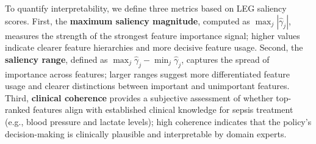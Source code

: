 To quantify interpretability, we define three metrics based on LEG saliency scores. First, the \textbf{maximum saliency magnitude}, computed as $\max_j |\hat{\gamma}_j|$, measures the strength of the strongest feature importance signal; higher values indicate clearer feature hierarchies and more decisive feature usage. Second, the \textbf{saliency range}, defined as $\max_j \hat{\gamma}_j - \min_j \hat{\gamma}_j$, captures the spread of importance across features; larger ranges suggest more differentiated feature usage and clearer distinctions between important and unimportant features. Third, \textbf{clinical coherence} provides a subjective assessment of whether top-ranked features align with established clinical knowledge for sepsis treatment (e.g., blood pressure and lactate levels); high coherence indicates that the policy's decision-making is clinically plausible and interpretable by domain experts.
